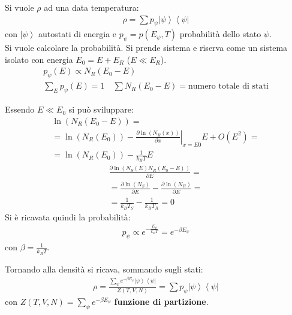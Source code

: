 Si vuole $\rho$ ad una data temperatura:
\begin{equation}\begin{split}
\rho=\sum{p_\psi \left |\psi  \right\rangle\left\langle \psi \right |}
\end{split}\end{equation}
con $\left |\psi  \right\rangle$ autostati di energia e $p_\psi =p\left(E_\psi ,T\right)$ probabilità dello stato $\psi $. \\ Si vuole calcolare la probabilità. Si prende sistema e riserva come un sistema isolato con energia $E_0=E+E_R$ ($E\ll E_R$).
\begin{equation}\begin{split}
p_\psi \left(E\right)\propto N_R\left(E_0-E\right) \\
\sum_{E}{p_\psi \left(E\right)}=1 \quad \sum{N_R\left(E_0-E\right)}=\textrm{numero totale di stati}
\end{split}\end{equation}

Essendo $E\ll E_0$ si può sviluppare:
\begin{equation}\begin{split}
\ln{\left(N_R\left(E_0-E\right)\right)}=\\
=\ln{\left(N_R\left(E_0\right)\right)}-\left.\frac{\partial \ln{\left(N_R\left(x\right)\right)}}{\partial x}\right|_{x=E0}E+O\left(E^2\right)=\\
=\ln{\left(N_R\left(E_0\right)\right)}-\frac{1}{k_BT}E
\end{split}\end{equation}
\begin{equation}\begin{split}
\frac{\partial \ln{\left(N_S\left(E\right)N_R\left(E_0-E\right)\right)}}{\partial E}=\\
=\frac{\partial \ln{\left(N_S\right)}}{\partial E}-\frac{\partial \ln{\left(N_R\right)}}{\partial E}=\\
=\frac{1}{k_BT_S}-\frac{1}{k_BT_R}=0
\end{split}\end{equation}
Si è ricavata quindi la probabilità:
\begin{equation}\begin{split}
p_\psi \propto e^{-\frac{E_\psi }{k_BT}}=e^{-\beta E_\psi }
\end{split}\end{equation}
con $\beta=\frac{1}{k_BT}$.

Tornando alla densità si ricava, sommando sugli stati:
\begin{equation}\begin{split}
\rho=\frac{\sum_{\psi }{e^{-\beta E_\psi }\left |\psi  \right\rangle\left\langle \psi \right |}}{Z\left(T,V,N\right)}=\sum{p_\psi \left |\psi  \right\rangle\left\langle \psi \right |}
\end{split}\end{equation}
con $Z\left(T,V,N\right)=\sum_{\psi }{e^{-\beta E_\psi }}$ \textbf{funzione di partizione}.

